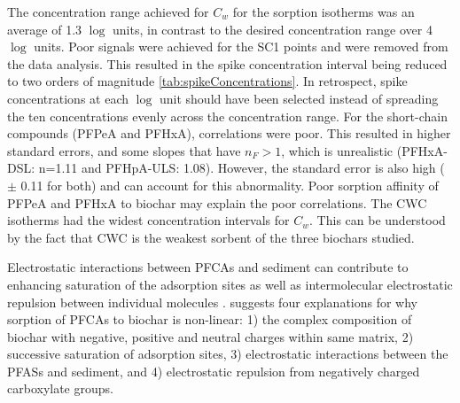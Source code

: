 The concentration range achieved for $C_w$ for the sorption isotherms was an average of 1.3 $\log$ units, in contrast to the desired concentration range over 4 $\log$ units. Poor signals were achieved for the SC1 points and were removed from the data analysis. This resulted in the spike concentration interval being reduced to two orders of magnitude \cref{tab:spikeConcentrations}. In retrospect, spike concentrations at each $\log$ unit should have been selected instead of spreading the ten concentrations evenly across the concentration range. For the short-chain compounds (PFPeA and PFHxA), correlations were poor. This resulted in higher standard errors, and some slopes that have $n_F>1$, which is unrealistic (PFHxA-DSL: n=1.11 and PFHpA-ULS: 1.08). However, the standard error is also high ($\pm$ 0.11 for both) and can account for this abnormality. Poor sorption affinity of PFPeA and PFHxA to biochar may explain the poor correlations. The CWC isotherms had the widest concentration intervals for $C_w$. This can be understood by the fact that CWC is the weakest sorbent of the three biochars studied.  

Electrostatic interactions between PFCAs and sediment can contribute to enhancing saturation of the adsorption sites as well as intermolecular electrostatic repulsion between individual molecules \citep{higgins2006sorption,yin2022insights}. \cite{yin2022insights} suggests four explanations for why sorption of PFCAs to biochar is non-linear: 1) the complex composition of biochar with negative, positive and neutral charges within same matrix, 2) successive saturation of adsorption sites, 3) electrostatic interactions between the PFASs and sediment, and 4) electrostatic repulsion from negatively charged carboxylate groups.

